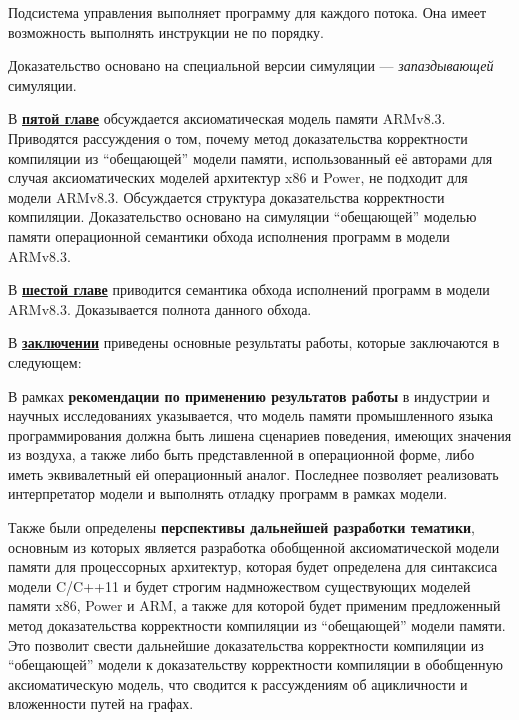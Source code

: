 Подсистема управления выполняет программу для каждого потока. Она имеет возможность выполнять инструкции не по порядку.


Доказательство основано на специальной версии симуляции --- \emph{запаздывающей} симуляции.

В \underline{\textbf{пятой главе}} обсуждается аксиоматическая модель памяти ARMv8.3.
Приводятся рассуждения о том, почему
метод доказательства корректности компиляции из ``обещающей'' модели памяти, использованный её авторами для случая
аксиоматических моделей архитектур x86 и Power, не подходит для модели ARMv8.3.
Обсуждается структура доказательства корректности компиляции. Доказательство основано на симуляции ``обещающей'' моделью
памяти операционной семантики обхода исполнения программ в модели ARMv8.3.

В \underline{\textbf{шестой главе}} приводится семантика обхода исполнений программ в модели ARMv8.3. Доказывается
полнота данного обхода.

В \underline{\textbf{заключении}} приведены основные результаты работы, которые заключаются в следующем:


В рамках \textbf{рекомендации по применению результатов работы} в индустрии и научных исследованиях указывается,
что модель памяти промышленного языка программирования должна быть лишена сценариев поведения, имеющих значения
из воздуха, а также либо быть представленной в операционной форме, либо иметь эквивалетный ей операционный аналог.
Последнее позволяет реализовать интерпретатор модели и выполнять отладку программ в рамках модели.

Также были определены \textbf{перспективы дальнейшей разработки тематики}, основным из которых является
разработка обобщенной аксиоматической модели памяти для процессорных архитектур, которая будет
определена для синтаксиса модели C/C++11 и будет строгим надмножеством существующих моделей памяти
x86, Power и ARM, а также для которой будет применим предложенный метод доказательства корректности компиляции
из ``обещающей'' модели памяти. Это позволит свести дальнейшие доказательства корректности компиляции из
``обещающей'' модели к доказательству корректности компиляции в обобщенную аксиоматическую модель, что
сводится к рассуждениям об ацикличности и вложенности путей на графах.


